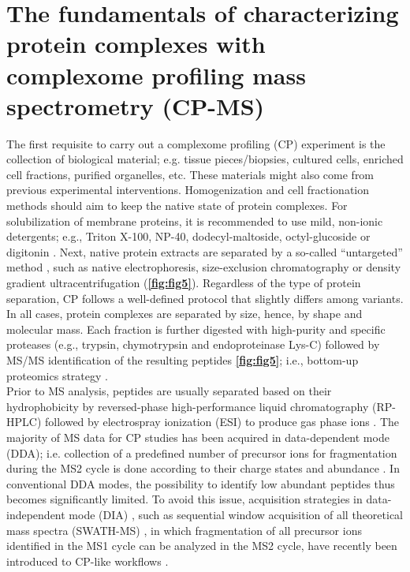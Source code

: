 \section{The fundamentals of characterizing protein complexes with complexome profiling mass spectrometry (CP-MS)} \label{sec:CP_MS_intro}
The first requisite to carry out a complexome profiling (CP) experiment is the collection of biological material; e.g. tissue pieces/biopsies, cultured cells, enriched cell fractions, purified organelles, etc. These materials might also come from previous experimental interventions. Homogenization and cell fractionation methods should aim to keep the native state of protein complexes. For solubilization of membrane proteins, it is recommended to use mild, non-ionic detergents; e.g., Triton X-100, NP-40, dodecyl-maltoside, octyl-glucoside or digitonin \cite{Eubel_2005, Wittig_2006}. Next, native protein extracts are separated by a so-called “untargeted” method \cite{Iacobucci_2021}, such as native electrophoresis, size-exclusion chromatography or density gradient ultracentrifugation (\textbf{\autoref{fig:fig5}}). Regardless of the type of protein separation, CP follows a well-defined protocol that slightly differs among variants. In all cases, protein complexes are separated by size, hence, by shape and molecular mass. Each fraction is further digested with high-purity and specific proteases (e.g., trypsin, chymotrypsin and endoproteinase Lys-C) followed by MS/MS identification of the resulting peptides \textbf{\autoref{fig:fig5}}; i.e., bottom-up proteomics strategy \cite{Zhang_2013}.\\
Prior to MS analysis, peptides are usually separated based on their hydrophobicity by reversed-phase high-performance liquid chromatography (RP-HPLC) followed by electrospray ionization (ESI) to produce gas phase ions \cite{Zhang_2013}. The majority of MS data for CP studies has been acquired in data-dependent mode (DDA); i.e. collection of a predefined number of precursor ions for fragmentation during the MS2 cycle is done according to their charge states and abundance \cite{Hu_2016}. In conventional DDA modes, the possibility to identify low abundant peptides thus becomes significantly limited. To avoid this issue, acquisition strategies in data-independent mode (DIA) \cite{Krasny_2021}, such as sequential window acquisition of all theoretical mass spectra (SWATH-MS) \cite{Gillet_2012}, in which fragmentation of all precursor ions identified in the MS1 cycle can be analyzed in the MS2 cycle, have recently been introduced to CP-like workflows \cite{Bludau_2020, Calvo_2020, Heusel_2019}.

